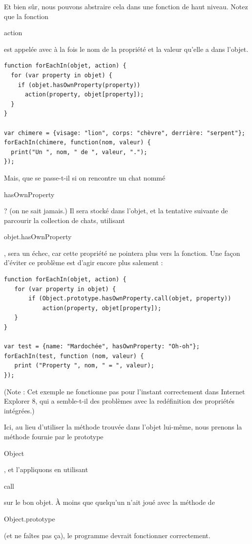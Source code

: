 \documentclass{FramateX}
\renewcommand{\texttt}[1]{\begin{sffamily}{#1}\end{sffamily}}
\begin{document}
Et bien sûr, nous pouvons abstraire cela dans une fonction de haut
niveau. Notez que la fonction \texttt{action} est appelée avec à la fois
le nom de la propriété et la valeur qu'elle a dans l'objet.

\begin{lstlisting}
function forEachIn(objet, action) {
  for (var property in objet) {
    if (objet.hasOwnProperty(property))
      action(property, objet[property]);
  }
}

var chimere = {visage: "lion", corps: "chèvre", derrière: "serpent"};
forEachIn(chimere, function(nom, valeur) {
  print("Un ", nom, " de ", valeur, ".");
});
\end{lstlisting}

Mais, que se passe-t-il si on rencontre un chat nommé
\texttt{hasOwnProperty} ? (on ne sait jamais.) Il sera stocké dans
l'objet, et la tentative suivante de parcourir la collection de chats,
utilisant \texttt{objet.hasOwnProperty}, sera un échec, car cette
propriété ne pointera plus vers la fonction. Une façon d'éviter ce
problème est d'agir encore plus salement :

\begin{lstlisting}
function forEachIn(objet, action) {
   for (var property in objet) {
       if (Object.prototype.hasOwnProperty.call(objet, property))
           action(property, objet[property]);
   }
}

var test = {name: "Mardochée", hasOwnProperty: "Oh-oh"};
forEachIn(test, function (nom, valeur) {
   print ("Property ", nom, " = ", valeur);
});
\end{lstlisting}

(Note : Cet exemple ne fonctionne pas pour l'instant correctement dans
Internet Explorer 8, qui a semble-t-il des problèmes avec la
redéfinition des propriétés intégrées.)

Ici, au lieu d'utiliser la méthode trouvée dans l'objet lui-même, nous
prenons la méthode fournie par le prototype \texttt{Object}, et
l'appliquons en utilisant \texttt{call} sur le bon objet. À moins que
quelqu'un n'ait joué avec la méthode de \texttt{Object.prototype} (et ne
faîtes pas ça), le programme devrait fonctionner correctement.

\begin{center}\end{center}
\end{document}
